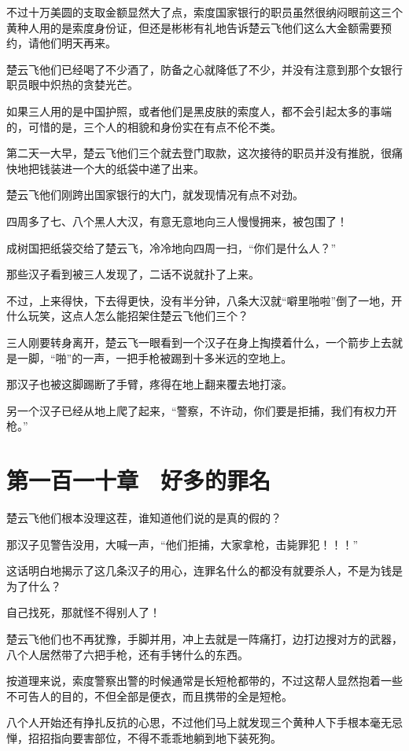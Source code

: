 不过十万美圆的支取金额显然大了点，索度国家银行的职员虽然很纳闷眼前这三个黄种人用的是索度身份证，但还是彬彬有礼地告诉楚云飞他们这么大金额需要预约，请他们明天再来。

楚云飞他们已经喝了不少酒了，防备之心就降低了不少，并没有注意到那个女银行职员眼中炽热的贪婪光芒。

如果三人用的是中国护照，或者他们是黑皮肤的索度人，都不会引起太多的事端的，可惜的是，三个人的相貌和身份实在有点不伦不类。

第二天一大早，楚云飞他们三个就去登门取款，这次接待的职员并没有推脱，很痛快地把钱装进一个大的纸袋中递了出来。

楚云飞他们刚跨出国家银行的大门，就发现情况有点不对劲。

四周多了七、八个黑人大汉，有意无意地向三人慢慢拥来，被包围了！

成树国把纸袋交给了楚云飞，冷冷地向四周一扫，“你们是什么人？”

那些汉子看到被三人发现了，二话不说就扑了上来。

不过，上来得快，下去得更快，没有半分钟，八条大汉就“噼里啪啦”倒了一地，开什么玩笑，这点人怎么能招架住楚云飞他们三个？

三人刚要转身离开，楚云飞一眼看到一个汉子在身上掏摸着什么，一个箭步上去就是一脚，“啪”的一声，一把手枪被踢到十多米远的空地上。

那汉子也被这脚踢断了手臂，疼得在地上翻来覆去地打滚。

另一个汉子已经从地上爬了起来，“警察，不许动，你们要是拒捕，我们有权力开枪。”

\section{第一百一十章　好多的罪名}

楚云飞他们根本没理这茬，谁知道他们说的是真的假的？

那汉子见警告没用，大喊一声，“他们拒捕，大家拿枪，击毙罪犯！！！”

这话明白地揭示了这几条汉子的用心，连罪名什么的都没有就要杀人，不是为钱是为了什么？

自己找死，那就怪不得别人了！

楚云飞他们也不再犹豫，手脚并用，冲上去就是一阵痛打，边打边搜对方的武器，八个人居然带了六把手枪，还有手铐什么的东西。

按道理来说，索度警察出警的时候通常是长短枪都带的，不过这帮人显然抱着一些不可告人的目的，不但全部是便衣，而且携带的全是短枪。

八个人开始还有挣扎反抗的心思，不过他们马上就发现三个黄种人下手根本毫无忌惮，招招指向要害部位，不得不乖乖地躺到地下装死狗。

